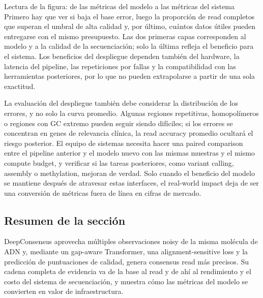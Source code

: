 
\begin{knowledgebox}{Lectura de la figura: de las métricas del modelo a las métricas del sistema}
Primero hay que ver si baja el base error, luego la proporción de read completos que superan el umbral de alta calidad y, por último, cuántos datos útiles pueden entregarse con el mismo presupuesto. Las dos primeras capas corresponden al modelo y a la calidad de la secuenciación; solo la última refleja el beneficio para el sistema. Los beneficios del despliegue dependen también del hardware, la latencia del pipeline, las repeticiones por fallas y la compatibilidad con las herramientas posteriores, por lo que no pueden extrapolarse a partir de una sola exactitud.
\end{knowledgebox}

La evaluación del despliegue también debe considerar la distribución de los errores, y no solo la curva promedio. Algunas regiones repetitivas, homopolímeros o regiones con GC extremo pueden seguir siendo difíciles; si los errores se concentran en genes de relevancia clínica, la read accuracy promedio ocultará el riesgo posterior. El equipo de sistemas necesita hacer una paired comparison entre el pipeline anterior y el modelo nuevo con las mismas muestras y el mismo compute budget, y verificar si las tareas posteriores, como variant calling, assembly o methylation, mejoran de verdad. Solo cuando el beneficio del modelo se mantiene después de atravesar estas interfaces, el real-world impact deja de ser una conversión de métricas fuera de línea en cifras de mercado.


\subsection{Resumen de la sección}

DeepConsensus aprovecha múltiples observaciones noisy de la misma molécula de ADN y, mediante un gap-aware Transformer, una alignment-sensitive loss y la predicción de puntuaciones de calidad, genera consensus read más precisos. Su cadena completa de evidencia va de la base al read y de ahí al rendimiento y el costo del sistema de secuenciación, y muestra cómo las métricas del modelo se convierten en valor de infraestructura.
